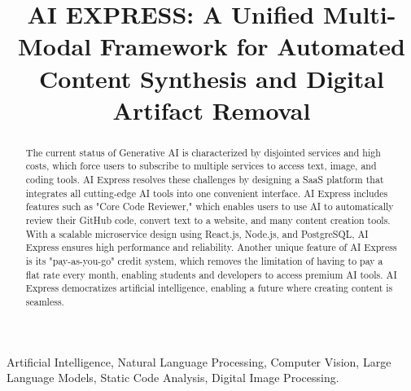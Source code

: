 \documentclass[conference]{IEEEtran}
\begin{document}
\title{AI EXPRESS: A Unified Multi-Modal Framework for Automated Content Synthesis and Digital Artifact Removal
}

\author{
}

\maketitle

\begin{abstract}
The current status of Generative AI is characterized by disjointed services and high costs, which force users to subscribe to multiple services to access text, image, and coding tools. AI Express resolves these challenges by designing a SaaS platform that integrates all cutting-edge AI tools into one convenient interface. AI Express includes features such as "Core Code Reviewer," which enables users to use AI to automatically review their GitHub code, convert text to a website, and many content creation tools.
With a scalable microservice design using React.js, Node.js, and PostgreSQL, AI Express ensures high performance and reliability. Another unique feature of AI Express is its "pay-as-you-go" credit system, which removes the limitation of having to pay a flat rate every month, enabling students and developers to access premium AI tools. AI Express democratizes artificial intelligence, enabling a future where creating content is seamless.
\end{abstract}

\begin{IEEEkeywords}
Artificial Intelligence, Natural Language Processing, Computer Vision, Large Language Models, Static Code Analysis, Digital Image Processing.\end{IEEEkeywords}
\end{document}
